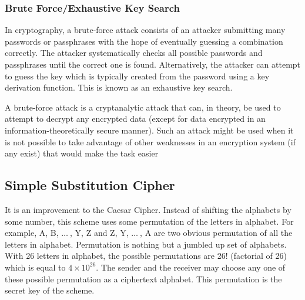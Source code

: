 \documentclass[british]{article}
\begin{document}
\subsubsection{Brute Force/Exhaustive Key Search}

In cryptography, a brute-force attack consists of an attacker submitting
many passwords or passphrases with the hope of eventually guessing
a combination correctly. The attacker systematically checks all possible
passwords and passphrases until the correct one is found. Alternatively,
the attacker can attempt to guess the key which is typically created
from the password using a key derivation function. This is known as
an exhaustive key search.

A brute-force attack is a cryptanalytic attack that can, in theory,
be used to attempt to decrypt any encrypted data (except for data
encrypted in an information-theoretically secure manner). Such an
attack might be used when it is not possible to take advantage of
other weaknesses in an encryption system (if any exist) that would
make the task easier

\pagebreak{}

\subsection{Simple Substitution Cipher}

It is an improvement to the Caesar Cipher. Instead of shifting the
alphabets by some number, this scheme uses some permutation of the
letters in alphabet. For example, A, B, $\ldots\:$, Y, Z and Z, Y,
$\ldots\:$, A are two obvious permutation of all the letters in alphabet.
Permutation is nothing but a jumbled up set of alphabets. With 26
letters in alphabet, the possible permutations are 26! (factorial
of 26) which is equal to $4\times10^{26}$. The sender and the receiver
may choose any one of these possible permutation as a ciphertext alphabet.
This permutation is the secret key of the scheme.
\end{document}
